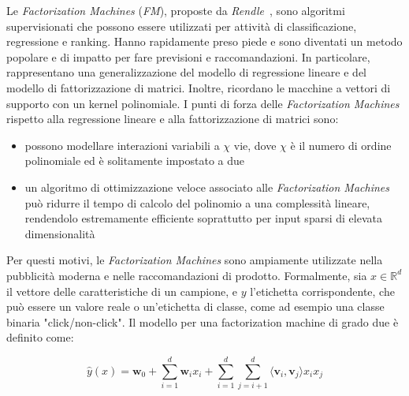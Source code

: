 Le \textit{Factorization Machines} (\textit{FM}), proposte da \textit{Rendle}~\cite{FM}, sono algoritmi supervisionati che possono essere utilizzati per attività di classificazione, regressione e ranking. Hanno rapidamente preso piede e sono diventati un metodo popolare e di impatto per fare previsioni e raccomandazioni. In particolare, rappresentano una generalizzazione del modello di regressione lineare e del modello di fattorizzazione di matrici. Inoltre, ricordano le macchine a vettori di supporto con un kernel polinomiale. I punti di forza delle \textit{Factorization Machines} rispetto alla regressione lineare e alla fattorizzazione di matrici sono: 
\begin{itemize}
    \item possono modellare interazioni variabili a $\chi$ vie, dove $\chi$ è il numero di ordine polinomiale ed è solitamente impostato a due
    \item un algoritmo di ottimizzazione veloce associato alle \textit{Factorization Machines} può ridurre il tempo di calcolo del polinomio a una complessità lineare, rendendolo estremamente efficiente soprattutto per input sparsi di elevata dimensionalità
\end{itemize}

Per questi motivi, le \textit{Factorization Machines} sono ampiamente utilizzate nella pubblicità moderna e nelle raccomandazioni di prodotto. Formalmente, sia $x \in \mathbb{R}^d$ il vettore delle caratteristiche di un campione, e $y$ l'etichetta corrispondente, che può essere un valore reale o un'etichetta di classe, come ad esempio una classe binaria "click/non-click".  
Il modello per una factorization machine di grado due è definito come:

\[
\hat{y}(x) = \mathbf{w}_0 + \sum_{i=1}^d \mathbf{w}_i x_i + \sum_{i=1}^d\sum_{j=i+1}^d \langle\mathbf{v}_i, \mathbf{v}_j\rangle x_i x_j
\]

